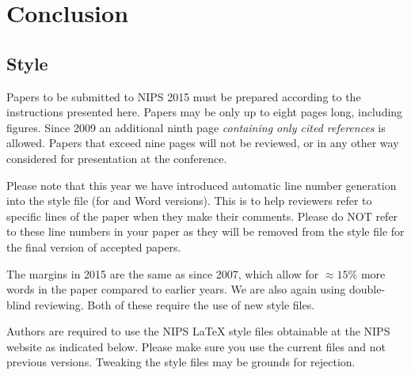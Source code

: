 \documentclass{article} %
\begin{document}
\section{Conclusion}


























\subsection{Style}

Papers to be submitted to NIPS 2015 must be prepared according to the
instructions presented here. Papers may be only up to eight pages long,
including figures. Since 2009 an additional ninth page \textit{containing only
cited references} is allowed. Papers that exceed nine pages will not be
reviewed, or in any other way considered for presentation at the conference.

Please note that this year we have introduced automatic line number generation
into the style file (for \LaTeXe and Word versions). This is to help reviewers
refer to specific lines of the paper when they make their comments. Please do
NOT refer to these line numbers in your paper as they will be removed from the
style file for the final version of accepted papers.

The margins in 2015 are the same as since 2007, which allow for $\approx 15\%$
more words in the paper compared to earlier years. We are also again using
double-blind reviewing. Both of these require the use of new style files.

Authors are required to use the NIPS \LaTeX{} style files obtainable at the
NIPS website as indicated below. Please make sure you use the current files and
not previous versions. Tweaking the style files may be grounds for rejection.


\end{document}
